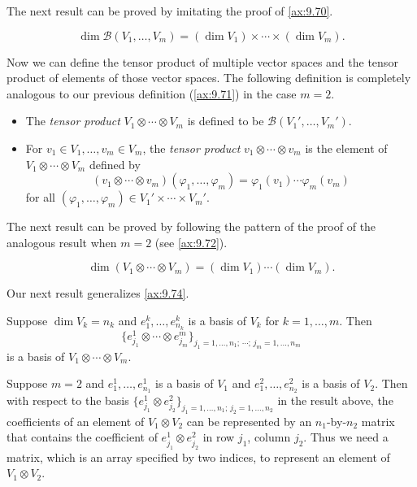 The next result can be proved by imitating the proof of \ref{ax:9.70}.

\begin{result}\label{ax:9.87}\leavevmode
\[ \dim\mathcal{B}(V_1,\dots,V_m)=(\dim V_1)\times\cdots\times(\dim V_m). \]
\end{result}

Now we can define the tensor product of multiple vector spaces and the tensor
product of elements of those vector spaces. The following definition is
completely analogous to our previous definition (\ref{ax:9.71}) in the case
$m=2$.

\begin{definition}\label{ax:9.88}\leavevmode
\begin{itemize}
\item The \emph{tensor product} $V_1\otimes\cdots\otimes V_m$ is defined to be
  $\mathcal{B}(V_1',\dots,V_m')$.
\item For $v_1\in V_1,\dots,v_m\in V_m$, the \emph{tensor product}
  $v_1\otimes\cdots\otimes v_m$ is the element of $V_1\otimes\cdots\otimes V_m$
  defined by
  \[ (v_1\otimes\cdots\otimes v_m)(\varphi_1,\dots,\varphi_m)
     = \varphi_1(v_1)\cdots\varphi_m(v_m) \]
  for all $(\varphi_1,\dots,\varphi_m)\in V_1'\times\cdots\times V_m'$.
\end{itemize}
\end{definition}

The next result can be proved by following the pattern of the proof of the
analogous result when $m=2$ (see \ref{ax:9.72}).

\begin{result}\label{ax:9.89}\leavevmode
\[ \dim(V_1\otimes\cdots\otimes V_m)=(\dim V_1)\cdots(\dim V_m). \]
\end{result}

Our next result generalizes \ref{ax:9.74}.

\begin{result}\label{ax:9.90}
Suppose $\dim V_k=n_k$ and $e^k_1,\dots,e^k_{n_k}$ is a basis of $V_k$ for
$k=1,\dots,m$. Then
\[ \{e^1_{j_1}\otimes\cdots\otimes e^m_{j_m}\}_{j_1=1,\dots,n_1;\,\cdots;\,
   j_m=1,\dots,n_m} \]
is a basis of $V_1\otimes\cdots\otimes V_m$.
\end{result}

Suppose $m=2$ and $e^1_1,\dots,e^1_{n_1}$ is a basis of $V_1$ and
$e^2_1,\dots,e^2_{n_2}$ is a basis of $V_2$. Then with respect to the basis
$\{e^1_{j_1}\otimes e^2_{j_2}\}_{j_1=1,\dots,n_1;\,j_2=1,\dots,n_2}$ in the
result above, the coefficients of an element of $V_1\otimes V_2$ can be
represented by an $n_1$-by-$n_2$ matrix that contains the coefficient of
$e^1_{j_1}\otimes e^2_{j_2}$ in row $j_1$, column $j_2$. Thus we need a matrix,
which is an array specified by two indices, to represent an element of
$V_1\otimes V_2$.

